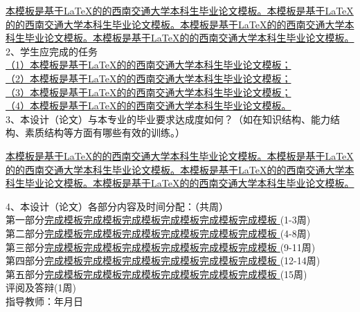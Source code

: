 \uline{本模板是基于LaTeX的的西南交通大学本科生毕业论文模板。本模板是基于LaTeX的的西南交通大学本科生毕业论文模板。本模板是基于LaTeX的的西南交通大学本科生毕业论文模板。本模板是基于LaTeX的的西南交通大学本科生毕业论文模板。}
\\2、学生应完成的任务\\
\noindent
\uline{（1）本模板是基于LaTeX的的西南交通大学本科生毕业论文模板；\\                    
       （2）本模板是基于LaTeX的的西南交通大学本科生毕业论文模板；\\      
       （3）本模板是基于LaTeX的的西南交通大学本科生毕业论文模板；\\      
       （4）本模板是基于LaTeX的的西南交通大学本科生毕业论文模板。}
\\3、本设计（论文）与本专业的毕业要求达成度如何？（如在知识结构、能力结构、素质结构等方面有哪些有效的训练。）

\uline{本模板是基于LaTeX的的西南交通大学本科生毕业论文模板。本模板是基于LaTeX的的西南交通大学本科生毕业论文模板。本模板是基于LaTeX的的西南交通大学本科生毕业论文模板。本模板是基于LaTeX的的西南交通大学本科生毕业论文模板。}

\newpage

\hspace{-0.85cm}4、本设计（论文）各部分内容及时间分配：（共\underline{}周）
\\第一部分\uline{\quad 完成模板完成模板完成模板完成模板完成模板完成模板 \quad}\hfill(1-3周) 
\\第二部分\uline{\quad 完成模板完成模板完成模板完成模板完成模板完成模板 \quad}\hfill(4-8周) 
\\第三部分\uline{\quad 完成模板完成模板完成模板完成模板完成模板完成模板 \quad}\hfill(9-11周)
\\第四部分\uline{\quad 完成模板完成模板完成模板完成模板完成模板完成模板 \quad}\hfill(12-14周)
\\第五部分\uline{\quad 完成模板完成模板完成模板完成模板完成模板完成模板 \quad}\hfill(15周)
\\评阅及答辩\hfill(1周)
\vspace{16cm}
\\指导教师：\hspace{4cm}年\hspace{1cm}月\hspace{1cm}日

